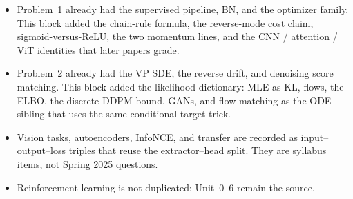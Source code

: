 \begin{summary}
\label{sum:dlu}
\begin{itemize}
    \item Problem~1 already had the supervised pipeline, BN, and the optimizer family. This block added the chain-rule formula, the reverse-mode cost claim, sigmoid-versus-ReLU, the two momentum lines, and the CNN / attention / ViT identities that later papers grade.
    \item Problem~2 already had the VP SDE, the reverse drift, and denoising score matching. This block added the likelihood dictionary: MLE as KL, flows, the ELBO, the discrete DDPM bound, GANs, and flow matching as the ODE sibling that uses the same conditional-target trick.
    \item Vision tasks, autoencoders, InfoNCE, and transfer are recorded as input--output--loss triples that reuse the extractor--head split. They are syllabus items, not Spring 2025 questions.
    \item Reinforcement learning is not duplicated; Unit~0--6 remain the source.
\end{itemize}
\end{summary}
